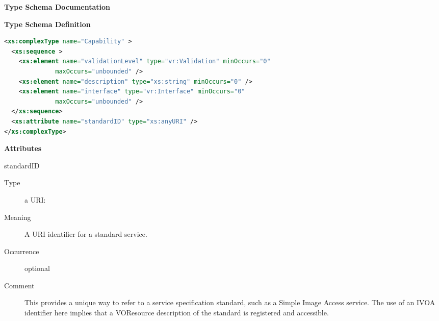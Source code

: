 \documentclass[11pt,a4paper]{ivoa}
\begin{document}
\begin{generated}
\begingroup
      	\renewcommand*\descriptionlabel[1]{%
      	\hbox to 5.5em{\emph{#1}\hfil}}\vspace{2ex}\noindent\textbf{ Type Schema Documentation}


\vspace{1ex}\noindent\textbf{ Type Schema Definition}

\begin{lstlisting}[language=XML,basicstyle=\footnotesize]
<xs:complexType name="Capability" >
  <xs:sequence >
    <xs:element name="validationLevel" type="vr:Validation" minOccurs="0"
              maxOccurs="unbounded" />
    <xs:element name="description" type="xs:string" minOccurs="0" />
    <xs:element name="interface" type="vr:Interface" minOccurs="0"
              maxOccurs="unbounded" />
  </xs:sequence>
  <xs:attribute name="standardID" type="xs:anyURI" />
</xs:complexType>
\end{lstlisting}

\vspace{0.5ex}\noindent\textbf{ Attributes}

\begingroup\small\begin{bigdescription}
\item[standardID]
\begin{description}
\item[Type] a URI: 
\item[Meaning] 
               A URI identifier for a standard service. 
            
\item[Occurrence] optional
\item[Comment] 
               This provides a unique way to refer to a service
               specification standard, such as a Simple Image Access service.
               The use of an IVOA identifier here implies that a
               VOResource description of the standard is registered and 
               accessible.  
            
\end{description}


\end{bigdescription}\endgroup




\end{generated}
\end{document}
